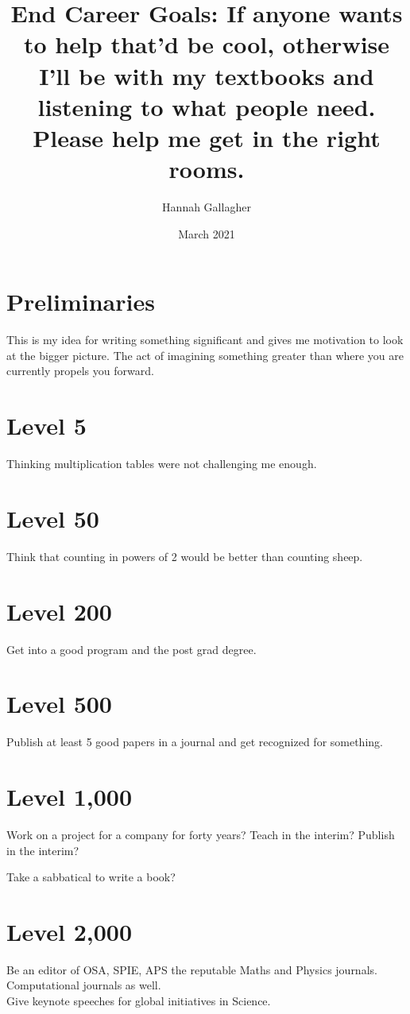 \documentclass{article}
\title{End Career Goals: If anyone wants to help that'd be cool, otherwise I'll be with my textbooks and listening to what people need. Please help me get in the right rooms.}
\author{Hannah Gallagher}
\date{March 2021}
\begin{document}
\maketitle

\section*{Preliminaries}
This is my idea for writing something significant and gives me motivation to look at the bigger picture. The act of imagining something greater than where you are currently propels you forward.  


\section*{Level 5}
Thinking multiplication tables were not challenging me enough. 


\section*{Level 50}
Think that counting in powers of 2 would be better than counting sheep. 



\section*{Level 200}
Get into a good program and the post grad degree. 


\section*{Level 500}
Publish at least 5 good papers in a journal and get recognized for something. 


\section*{Level 1,000}
Work on a project for a company for forty years? 
Teach in the interim? 
Publish in the interim? 

Take a sabbatical to write a book? 

\section*{Level 2,000}
Be an editor of OSA, SPIE, APS the reputable Maths and Physics journals. Computational journals as well. \\ 

Give keynote speeches for global initiatives in Science. 
\end{document}
